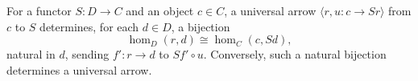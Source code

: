 For a functor $S: D \to C$ and an object $c \in C$, a universal arrow $\langle r, u: c \to Sr \rangle$ from $c$ to $S$ determines, for each $d \in D$, a bijection
$$\hom_D(r, d) \cong \hom_C(c, Sd),$$
natural in $d$, sending $f': r \to d$ to $Sf' \circ u$. Conversely, such a natural bijection determines a universal arrow.
